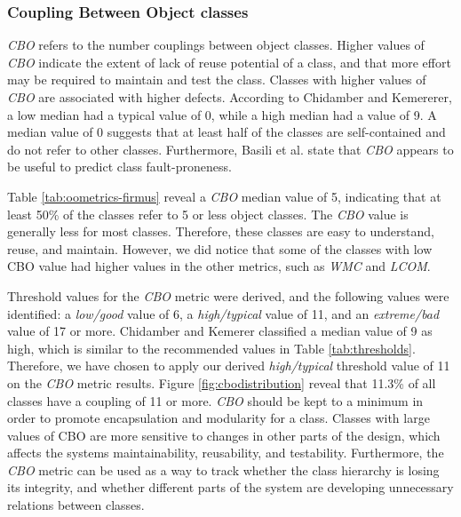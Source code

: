 \subsubsection{Coupling Between Object classes}

\textit{CBO} refers to the number couplings between object classes. Higher values of \textit{CBO} indicate the extent of lack of reuse potential of a class, and that more effort may be required to maintain and test the class. Classes with higher values of \textit{CBO} are associated with higher defects\cite{subramanyam2003empirical}. According to Chidamber and Kemererer\cite{chidamber1994metrics}, a low median had a typical value of 0, while a high median had a value of 9. A median value of 0 suggests that at least half of the classes are self-contained and do not refer to other classes. Furthermore, Basili et al.\cite{basili1996validation} state that \textit{CBO} appears to be useful to predict class fault-proneness. 

Table \ref{tab:oometrics-firmus} reveal a \textit{CBO} median value of 5, indicating that at least 50\% of the classes refer to 5 or less object classes. The \textit{CBO} value is generally less for most classes. Therefore, these classes are easy to understand, reuse, and maintain. However, we did notice that some of the classes with low CBO value had higher values in the other metrics, such as \textit{WMC} and \textit{LCOM}. 

Threshold values for the \textit{CBO} metric were derived, and the following values were identified: a \textit{low/good} value of 6, a \textit{high/typical} value of 11, and an \textit{extreme/bad} value of 17 or more. Chidamber and Kemerer\cite{chidamber1994metrics} classified a median value of 9 as high, which is similar to the recommended values in Table \ref{tab:thresholds}. Therefore, we have chosen to apply our derived \textit{high/typical} threshold value of 11 on the \textit{CBO} metric results. Figure \ref{fig:cbodistribution} reveal that 11.3\% of all classes have a coupling of 11 or more. \textit{CBO} should be kept to a minimum in order to promote encapsulation and modularity for a class. Classes with large values of CBO are more sensitive to changes in other parts of the design, which affects the systems maintainability, reusability, and testability. Furthermore, the \textit{CBO} metric can be used as a way to track whether the class hierarchy is losing its integrity, and whether different parts of the system are developing unnecessary relations between classes.


